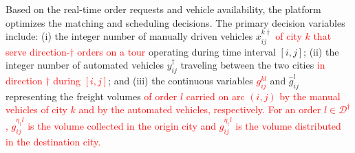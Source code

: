 \documentclass[10pt, reqno]{amsart}
\begin{document}
Based on the real-time order requests and vehicle availability, the platform optimizes the matching and scheduling decisions. The primary decision variables include: (i) the integer number of manually driven vehicles $x_{ij}^{k\dagger}$ \textcolor{red}{of city $k$ that serve direction-$\dagger$ orders on a tour} operating during time interval $[i, j]$; (ii) the integer number of automated vehicles $y_{ij}^{\dagger}$ traveling between the two cities \textcolor{red}{in direction $\dagger$ during $[i,j]$}; and (iii) the continuous variables \textcolor{red}{$g_{ij}^{kl}$} and $\hat{g}_{ij}^{l}$ representing the freight volumes \textcolor{red}{of order $l$ carried on arc $(i,j)$ by the manual vehicles of city $k$ and by the automated vehicles, respectively. For an order $l\in\mathcal{D}^{\dagger}$, $g_{ij}^{\eta_{\dagger} l}$ is the volume collected in the origin city and $g_{ij}^{\bar{\eta}_{\dagger} l}$ is the volume distributed in the destination city.}
\end{document}
